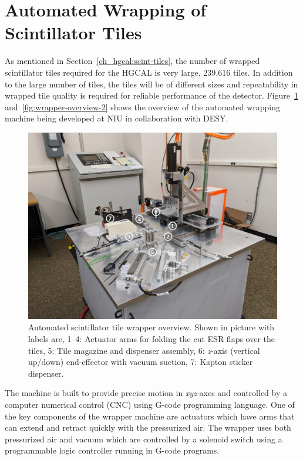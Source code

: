 \clearpage
\section{
  Automated Wrapping of Scintillator Tiles
 }\label{ch_hgcal:wrapping}

As mentioned in Section~\ref{ch_hgcal:scint-tiles}, the number
of wrapped scintillator tiles required for the \gls{HGCAL}
is very large, 239,616 tiles. In addition to the large number
of tiles, the tiles will be of different sizes and repeatability
in wrapped tile quality is required for reliable performance
of the detector. Figure~\ref{fig:wrapper-overview-1} and~\ref{fig:wrapper-overview-2}
shows the overview
of the automated wrapping machine being developed at NIU in collaboration
with \gls{DESY}.

\begin{figure}[!ht]
  \centering
  \includegraphics[width=\textwidth,page=1]{figures/wrapper_machine_pics.pdf}
  \caption[Automated scintillator tile wrapper overview]
  {Automated scintillator tile wrapper overview. Shown in picture with labels are,
    1--4: Actuator arms for folding the cut ESR flaps over the tiles,
    5: Tile magazine and dispenser assembly, 6: \textit{z}-axis (vertical up/down) end-effector
    with vacuum suction, 7: Kapton sticker dispenser.}%
  \label{fig:wrapper-overview-1}
\end{figure}

The machine is built to provide precise motion in \textit{xyz}-axes
and controlled by a computer numerical control (CNC) using G-code programming language.
One of the key components of the wrapper machine are actuators
which have arms that can extend and retract quickly with the
pressurized air. The wrapper uses both pressurized air and vacuum which
are controlled
by a solenoid switch using a
programmable logic controller running in G-code programs.

